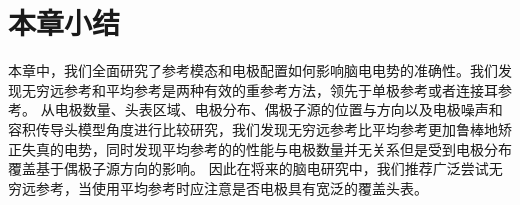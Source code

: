 \section{本章小结}
本章中，我们全面研究了参考模态和电极配置如何影响脑电电势的准确性。我们发现无穷远参考和平均参考是两种有效的重参考方法，领先于单极参考或者连接耳参考。 从电极数量、头表区域、电极分布、偶极子源的位置与方向以及电极噪声和容积传导头模型角度进行比较研究，我们发现无穷远参考比平均参考更加鲁棒地矫正失真的电势，同时发现平均参考的的性能与电极数量并无关系但是受到电极分布覆盖基于偶极子源方向的影响。 因此在将来的脑电研究中，我们推荐广泛尝试无穷远参考，当使用平均参考时应注意是否电极具有宽泛的覆盖头表。